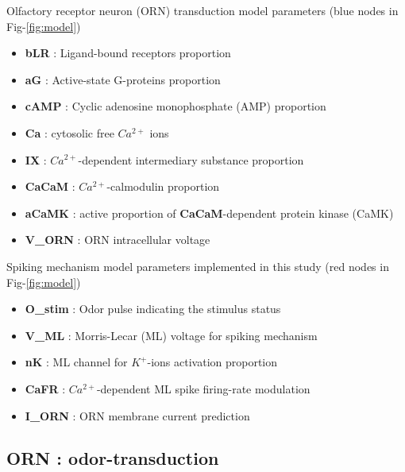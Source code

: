 \documentclass[
]{article}
\providecommand{\tightlist}{%
  \setlength{\itemsep}{0pt}\setlength{\parskip}{0pt}}
\begin{document}
Olfactory receptor neuron (ORN) transduction model parameters (blue nodes in Fig-\ref{fig:model})

\begin{itemize}
\tightlist
\item
  \textbf{bLR} : Ligand-bound receptors proportion
\item
  \textbf{aG} : Active-state G-proteins proportion
\item
  \textbf{cAMP} : Cyclic adenosine monophosphate (AMP) proportion
\item
  \textbf{Ca} : cytosolic free \(Ca^{2+}\) ions
\item
  \textbf{IX} : \(Ca^{2+}\)-dependent intermediary substance proportion
\item
  \textbf{CaCaM} : \(Ca^{2+}\)-calmodulin proportion
\item
  \textbf{aCaMK} : active proportion of \textbf{CaCaM}-dependent protein kinase (CaMK)
\item
  \textbf{V\_ORN} : ORN intracellular voltage
\end{itemize}

Spiking mechanism model parameters implemented in this study (red nodes in Fig-\ref{fig:model})

\begin{itemize}
\tightlist
\item
  \textbf{O\_stim} : Odor pulse indicating the stimulus status
\item
  \textbf{V\_ML} : Morris-Lecar (ML) voltage for spiking mechanism
\item
  \textbf{nK} : ML channel for \(K^+\)-ions activation proportion
\item
  \textbf{CaFR} : \(Ca^{2+}\)-dependent ML spike firing-rate modulation
\item
  \textbf{I\_ORN} : ORN membrane current prediction
\end{itemize}

\hypertarget{orn-odor-transduction}{%
\subsection{ORN : odor-transduction}\label{orn-odor-transduction}}
\end{document}

